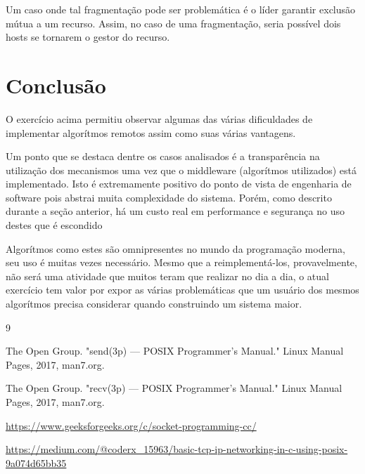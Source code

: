 \documentclass{article}
\begin{document}
Um caso onde tal fragmentação pode ser problemática é o líder garantir exclusão
mútua a um recurso. Assim, no caso de uma fragmentação, seria possível dois
hosts se tornarem o gestor do recurso.


\section{Conclusão}
O exercício acima permitiu observar algumas das várias dificuldades de
implementar algorítmos remotos assim como suas várias vantagens.

Um ponto que se destaca dentre os casos analisados é a transparência na
utilização dos mecanismos uma vez que o middleware (algorítmos utilizados) está
implementado. Isto é extremamente positivo do ponto de vista de engenharia de
software pois abstrai muita complexidade do sistema. Porém, como descrito
durante a seção anterior, há um custo real em performance e segurança no uso
destes que é escondido

Algorítmos como estes são omnipresentes no mundo da programação moderna, seu uso
é muitas vezes necessário. Mesmo que a reimplementá-los, provavelmente, não será
uma atividade que muitos teram que realizar no dia a dia, o atual exercício tem
valor por expor as várias problemáticas que um usuário dos mesmos algorítmos
precisa considerar quando construindo um sistema maior.

\begin{thebibliography}{9}

  The Open Group. "send(3p) — POSIX Programmer's Manual." Linux Manual Pages, 2017, man7.org.

  The Open Group. "recv(3p) — POSIX Programmer's Manual." Linux Manual Pages, 2017, man7.org.

  \url{https://www.geeksforgeeks.org/c/socket-programming-cc/}

  \url{https://medium.com/@coderx_15963/basic-tcp-ip-networking-in-c-using-posix-9a074d65bb35}

\end{thebibliography}
\end{document}
